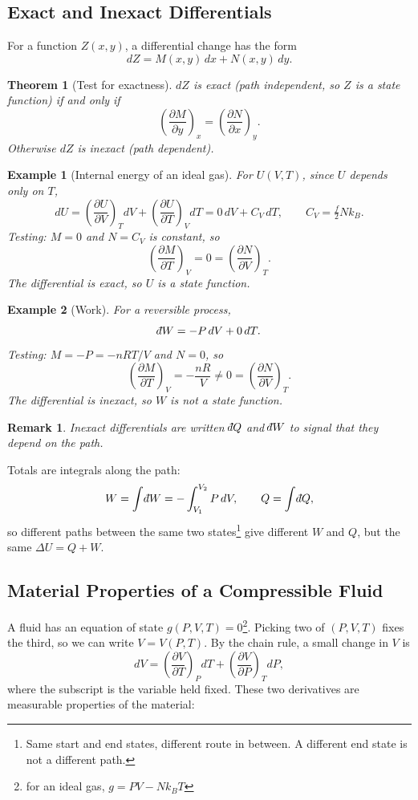 \documentclass{article}
\newtheorem{theorem}{Theorem}
\newtheorem*{example}{Example}
\newtheorem{remark}{Remark}
\newcommand{\dbar}{\mathchar'26\mkern-12mu d}
\begin{document}
\subsection{Exact and Inexact Differentials}
For a function $Z(x,y)$, a differential change has the form
\begin{equation}
    \label{eq:dZ}
    dZ = M(x,y)\,dx + N(x,y)\,dy.
\end{equation}

\begin{theorem}[Test for exactness]
    $dZ$ is exact (path independent, so $Z$ is a state function) if and only if
    \begin{equation}
        \left(\frac{\partial M}{\partial y}\right)_x = \left(\frac{\partial N}{\partial x}\right)_y.
    \end{equation}
    Otherwise $dZ$ is inexact (path dependent).
\end{theorem}
\begin{example}[Internal energy of an ideal gas]
    For $U(V,T)$, since $U$ depends only on $T$,
    \[dU = \left(\frac{\partial U}{\partial V}\right)_T dV + \left(\frac{\partial U}{\partial T}\right)_V dT = 0\,dV + C_V\,dT, \qquad C_V = \tfrac{f}{2}Nk_B.\]
    Testing: $M = 0$ and $N = C_V$ is constant, so
    \[\left(\frac{\partial M}{\partial T}\right)_V = 0 = \left(\frac{\partial N}{\partial V}\right)_T.\]
    The differential is exact, so $U$ is a state function.
\end{example}
\begin{example}[Work]
    For a reversible process,
    \[\dbar W = -P\,dV + 0\,dT.\]
    Testing: $M = -P = -nRT/V$ and $N = 0$, so
    \[\left(\frac{\partial M}{\partial T}\right)_V = -\frac{nR}{V} \neq 0 = \left(\frac{\partial N}{\partial V}\right)_T.\]
    The differential is inexact, so $W$ is not a state function.
\end{example}

\begin{remark}
    Inexact differentials are written $\dbar Q$ and $\dbar W$ to signal that they depend on the path.
\end{remark}
Totals are integrals along the path:
\[W = \int \dbar W = -\int_{V_1}^{V_2} P \, dV, \qquad Q = \int \dbar Q,\]
so different paths between the same two states\footnote{Same start and end states, different route in between. A different end state is not a different path.} give different $W$ and $Q$, but the same $\Delta U = Q + W$.

\subsection{Material Properties of a Compressible Fluid}
A fluid has an equation of state $g(P,V,T) = 0$\footnote{for an ideal gas, $g = PV - Nk_BT$}. Picking two of $(P,V,T)$ fixes the third, so we can write $V = V(P,T)$. By the chain rule, a small change in $V$ is
\[dV = \left(\frac{\partial V}{\partial T}\right)_P dT + \left(\frac{\partial V}{\partial P}\right)_T dP,\]
where the subscript is the variable held fixed. These two derivatives are measurable properties of the material:
\end{document}
